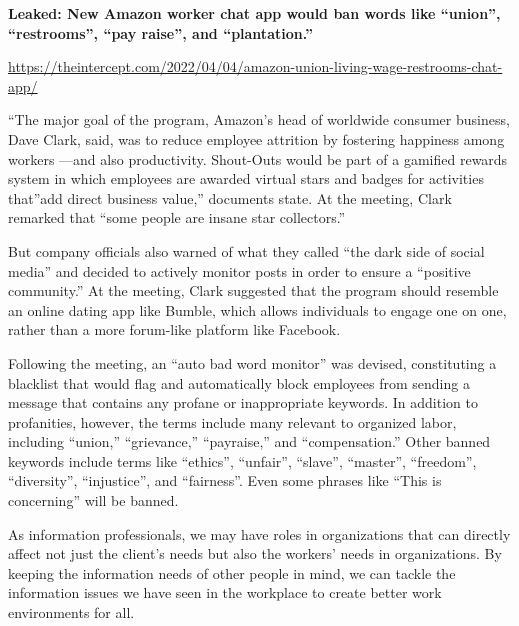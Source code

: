 \documentclass[
  letterpaper,
  DIV=11,
  numbers=noendperiod]{scrreprt}
\begin{document}
\begin{tcolorbox}[enhanced jigsaw, arc=.35mm, bottomrule=.15mm, bottomtitle=1mm, breakable, colback=white, colbacktitle=quarto-callout-note-color!10!white, colframe=quarto-callout-note-color-frame, coltitle=black, left=2mm, leftrule=.75mm, opacityback=0, opacitybacktitle=0.6, rightrule=.15mm, title=\textcolor{quarto-callout-note-color}{\faInfo}\hspace{0.5em}{In the news}, titlerule=0mm, toprule=.15mm, toptitle=1mm]

\textbf{Leaked: New Amazon worker chat app would ban words like
``union'', ``restrooms'', ``pay raise'', and ``plantation.''}

\url{https://theintercept.com/2022/04/04/amazon-union-living-wage-restrooms-chat-app/}

``The major goal of the program, Amazon's head of worldwide consumer
business, Dave Clark, said, was to reduce employee attrition by
fostering happiness among workers ---and also productivity. Shout-Outs
would be part of a gamified rewards system in which employees are
awarded virtual stars and badges for activities that''add direct
business value,'' documents state. At the meeting, Clark remarked that
``some people are insane star collectors.''

But company officials also warned of what they called ``the dark side of
social media'' and decided to actively monitor posts in order to ensure
a ``positive community.'' At the meeting, Clark suggested that the
program should resemble an online dating app like Bumble, which allows
individuals to engage one on one, rather than a more forum-like platform
like Facebook.

Following the meeting, an ``auto bad word monitor'' was devised,
constituting a blacklist that would flag and automatically block
employees from sending a message that contains any profane or
inappropriate keywords. In addition to profanities, however, the terms
include many relevant to organized labor, including ``union,''
``grievance,'' ``payraise,'' and ``compensation.'' Other banned keywords
include terms like ``ethics'', ``unfair'', ``slave'', ``master'',
``freedom'', ``diversity'', ``injustice'', and ``fairness''. Even some
phrases like ``This is concerning'' will be banned.

\end{tcolorbox}

As information professionals, we may have roles in organizations that
can directly affect not just the client's needs but also the workers'
needs in organizations. By keeping the information needs of other people
in mind, we can tackle the information issues we have seen in the
workplace to create better work environments for all.
\end{document}
